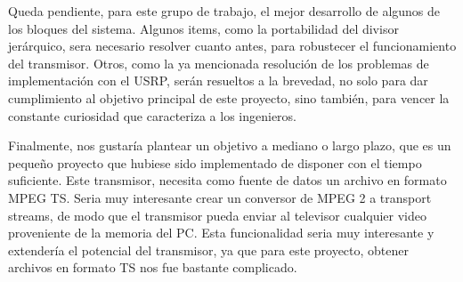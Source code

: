 Queda pendiente, para este grupo de trabajo, el mejor desarrollo de algunos de los bloques del sistema. Algunos items, como la portabilidad del divisor jerárquico, sera necesario resolver cuanto antes, para robustecer el funcionamiento del transmisor. Otros, como la ya mencionada resolución de los problemas de implementación con el USRP, serán resueltos a la brevedad, no solo para dar cumplimiento al objetivo principal de este proyecto, sino también, para vencer la constante curiosidad que caracteriza a los ingenieros.

Finalmente, nos gustaría plantear un objetivo a mediano o largo plazo, que es un pequeño proyecto que hubiese sido implementado de disponer con el tiempo suficiente. Este transmisor, necesita como fuente de datos un archivo en formato MPEG TS. Seria muy interesante crear un conversor de MPEG 2 a transport streams, de modo que el transmisor pueda  enviar al televisor cualquier video proveniente de la memoria del PC. Esta funcionalidad seria muy interesante y extendería el potencial del transmisor, ya que para este proyecto, obtener archivos en formato TS nos fue bastante complicado.